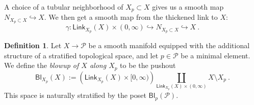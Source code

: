 \documentclass{article}
\newcommand{\mc}[1]{\mathcal{#1}}
\newcommand{\msf}[1]{\mathsf{#1}}
\newcommand{\link}{\msf{Link}}
\newcommand{\bl}{\msf{Bl}}
\theoremstyle{definition}
\newtheorem{definition}[theorem]{Definition}
\begin{document}

A choice of a tubular neighborhood of $X_p \subset X$ gives us a smooth map 
$N_{X_p \subset X} \hookrightarrow X$. 
We then get a smooth map from the thickened link to $X$:
$$\gamma: \link_{X_p}(X) \times (0,\infty) \hookrightarrow N_{X_p \subset X} \hookrightarrow X~.$$

\begin{definition}
    Let $X \to \mc{P}$ be a smooth manifold equipped with the additional structure of a stratified topological space, and let $p \in \mc{P}$ be a minimal element.
    We define the \emph{blowup of $X$ along $X_p$} to be the pushout
    $$\bl_{X_p}(X):=\left(\link_{X_p}(X) \times [0,\infty)\right) \coprod_{\link_{X_p}(X) \times (0,\infty)} 
    X \setminus X_p~.$$
    This space is naturally stratified by the poset $\bl_p(\mc{P})$.
\end{definition}
\end{document}
